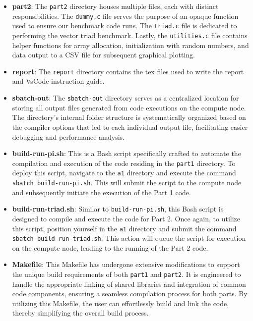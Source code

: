 \documentclass{article}
\begin{document}
\begin{multicols}{2}
\begin{itemize}
        \item \textbf{part2}: The \texttt{part2} directory houses multiple files, each with distinct responsibilities. The \texttt{dummy.c} file serves the purpose of an opaque function used to ensure our benchmark code runs. The \texttt{triad.c} file is dedicated to performing the vector triad benchmark. Lastly, the \texttt{utilities.c} file contains helper functions for array allocation, initialization with random numbers, and data output to a CSV file for subsequent graphical plotting.
        \newpage
        \item \textbf{report}: The \texttt{report} directory contains the tex files used to write the report and VsCode instruction guide.
        \item \textbf{sbatch-out}: The \texttt{sbatch-out} directory serves as a centralized location for storing all output files generated from code executions on the compute node. The directory's internal folder structure is systematically organized based on the compiler options that led to each individual output file, facilitating easier debugging and performance analysis.
        \item \textbf{build-run-pi.sh}: This is a Bash script specifically crafted to automate the compilation and execution of the code residing in the \texttt{part1} directory. To deploy this script, navigate to the \texttt{a1} directory and execute the command \texttt{sbatch build-run-pi.sh}. This will submit the script to the compute node and subsequently initiate the execution of the Part 1 code.
        \item \textbf{build-run-triad.sh}: Similar to \texttt{build-run-pi.sh}, this Bash script is designed to compile and execute the code for Part 2. Once again, to utilize this script, position yourself in the \texttt{a1} directory and submit the command \texttt{sbatch build-run-triad.sh}. This action will queue the script for execution on the compute node, leading to the running of the Part 2 code.
        \item \textbf{Makefile}: This Makefile has undergone extensive modifications to support the unique build requirements of both \texttt{part1} and \texttt{part2}. It is engineered to handle the appropriate linking of shared libraries and integration of common code components, ensuring a seamless compilation process for both parts. By utilizing this Makefile, the user can effortlessly build and link the code, thereby simplifying the overall build process.
    \end{itemize} 
\end{multicols}
\end{document}
